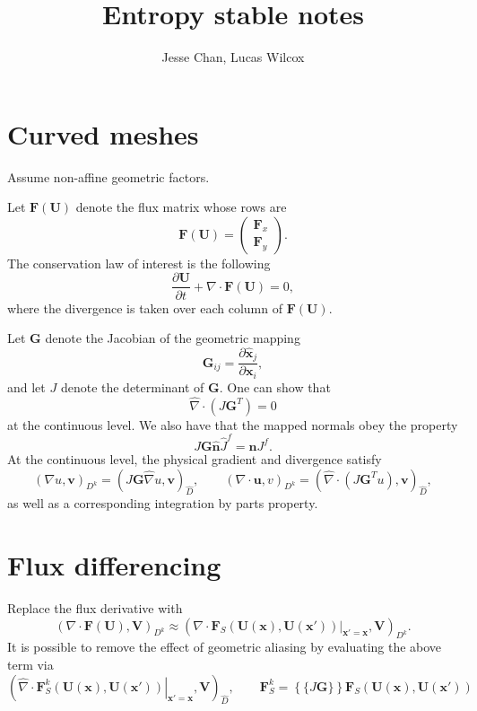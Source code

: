\documentclass[preprint,10pt]{article}
\date{}
\author{Jesse Chan, Lucas Wilcox}
\title{Entropy stable notes}
\theoremstyle{definition}
\theoremstyle{lemma}
\theoremstyle{theorem}
\theoremstyle{assumption}
\renewcommand{\hat}{\widehat}
\newcommand{\pd}[2]{\frac{\partial#1}{\partial#2}}
\newcommand{\LRp}[1]{\left( #1 \right)}
\newcommand{\LRa}[1]{\left\langle #1 \right\rangle}
\newcommand{\LRc}[1]{\left\{ #1 \right\}}
\newcommand{\LRl}[1]{\left. #1 \right|}
\newcommand{\Grad} {\ensuremath{\nabla}}
\newcommand{\avg}[1] {\ensuremath{\LRc{\!\{#1\}\!}}}
\renewcommand{\d}{\partial}
\begin{document}
\maketitle


\section{Curved meshes}

Assume non-affine geometric factors.  

Let $\bm{F}(\bm{U})$ denote the flux matrix whose rows are 
\[
\bm{F}(\bm{U}) = \LRp{
\begin{array}{c}
\bm{F}_x \\
\bm{F}_y
\end{array}
}.
\]
The conservation law of interest is the following
\[
\pd{\bm{U}}{t} + \Grad \cdot \bm{F}(\bm{U}) = 0,
\]
where the divergence is taken over each column of $\bm{F}(\bm{U})$.  

Let $\bm{G}$ denote the Jacobian of the geometric mapping
\[
\bm{G}_{ij} = \pd{\hat{\bm{x}}_j}{\bm{x}_i},
\]
and let $J$ denote the determinant of $\bm{G}$.  One can show that
\[
\hat{\Grad} \cdot \LRp{J\bm{G}^T} = 0  
\]
at the continuous level.  We also have that the mapped normals obey the property
\[
J\bm{G} \hat{\bm{n}}\hat{J}^f = \bm{n}J^f.
\]
At the continuous level, the physical gradient and divergence satisfy
\[
\LRp{\Grad u, \bm{v}}_{D^k} = \LRp{J\bm{G} \hat{\Grad} u,\bm{v}}_{\hat{D}}, \qquad \LRp{\Grad\cdot \bm{u},v}_{D^k} = \LRp{\hat{\Grad}\cdot \LRp{J\bm{G}^T u},\bm{v}}_{\hat{D}}, 
\]
as well as a corresponding integration by parts property.  

\section{Flux differencing}

Replace the flux derivative with
\[
\LRp{\Grad \cdot \bm{F}(\bm{U}),\bm{V}}_{D^k} \approx
\LRp{\LRl{\Grad \cdot \bm{F}_S(\bm{U}(\bm{x}),\bm{U}(\bm{x}'))}_{\bm{x}' = \bm{x}},\bm{V}}_{D^k}.
\]
It is possible to remove the effect of geometric aliasing by evaluating the above term via
\[
\LRp{\LRl{\hat{\Grad} \cdot \bm{F}^k_S(\bm{U}(\bm{x}),\bm{U}(\bm{x}'))}_{\bm{x}' = \bm{x}},\bm{V}}_{\hat{D}}, \qquad \bm{F}^k_S = \avg{J\bm{G}}\bm{F}_S\LRp{\bm{U}(\bm{x}),\bm{U}(\bm{x}')}
\]

\end{document}
